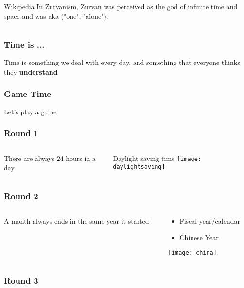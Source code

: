 \documentclass[aspectratio=169, 15pt]{beamer}
\begin{document}
{\begin{gdblank}
\begin{columns}
\begin{column}{0.5\textwidth}
				\begin{block}{Wikipedia}
					In Zurvanism, Zurvan was perceived as the god of infinite time and space and was aka ("one", "alone").
				\end{block} 
			\end{column}
		\end{columns}     
	\end{gdblank}
	\begin{gdblank}
		\frametitle{Time is ...}
		\LARGE\centering Time is something we deal with every day, and something that everyone thinks they 
		\bf understand
	\end{gdblank} 
	\begin{gdblank}
		\frametitle{Game Time}
		\Huge\centering Let's play a game
	\end{gdblank} 
	\begin{gdblank}
		\frametitle{Round 1}    
		\begin{columns}
			\begin{column}{0.70\textwidth}
				\LARGE There are always 24 hours in a day 
				\pause     
			\end{column}
			\begin{column}{0.3\textwidth}
				\large\centering Daylight saving time 
				\vskip0.5cm
				\texttt{[image: daylightsaving]}
			\end{column}
		\end{columns}
	\end{gdblank} 
	\begin{gdblank}
		\frametitle{Round 2}    
		\begin{columns}
			\begin{column}{0.70\textwidth}
				\LARGE A month always ends in the same year it started
				\pause     
			\end{column}
			\begin{column}{0.3\textwidth}
				\large\centering 
				\begin{itemize}
					\item Fiscal year/calendar
					\item Chinese Year
				\end{itemize}
				\vskip0.5cm
				\texttt{[image: china]}
			\end{column}
		\end{columns}
	\end{gdblank} 
	\begin{gdblank}
		\frametitle{Round 3}    
		\begin{columns}
			\begin{column}{0.70\textwidth}

\end{column}
\end{columns}
\end{gdblank}}
\end{document}
